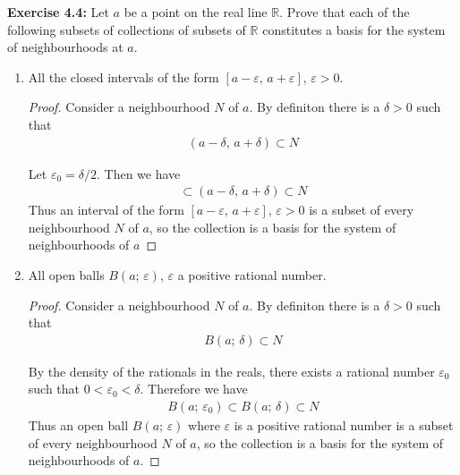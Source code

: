 \documentclass{article}
\begin{document}
\textbf{Exercise 4.4:} Let $a$ be a point on the real line $\mathbb{R}$. Prove that each of the following subsets of collections of 
subsets of $\mathbb{R}$ constitutes a basis for the system of neighbourhoods at $a$.

\begin{enumerate}[label=\roman*)]
    \item All the closed intervals of the form $[a - \varepsilon,\,a + \varepsilon],\, \varepsilon > 0$.
    
    \begin{proof}
        Consider a neighbourhood $N$ of $a$. By definiton there is a $\delta > 0$ such that
        \begin{align*}
            (a - \delta,\,a + \delta) \subset N
        \end{align*}

        Let $\varepsilon_0 = \delta / 2$. Then we have
        \begin{align*}
            [a - \varepsilon_0,\,a + \varepsilon_0] \subset (a - \delta,\,a + \delta) \subset N
        \end{align*}
        Thus an interval of the form $[a - \varepsilon,\,a + \varepsilon],\, \varepsilon > 0$ is a subset of every neighbourhood $N$ of $a$,
        so the collection is a basis for the system of neighbourhoods of $a$
    \end{proof}

    \item All open balls $B(a;\, \varepsilon)$, $\varepsilon$ a positive rational number.
    
    \begin{proof}
        Consider a neighbourhood $N$ of $a$. By definiton there is a $\delta > 0$ such that
        \begin{align*}
            B(a;\,\delta) \subset N
        \end{align*}

        By the density of the rationals in the reals, there exists a rational number $\varepsilon_0$ such that $0 < \varepsilon_0 < \delta$.
        Therefore we have
        \begin{align*}
            B(a;\,\varepsilon_0) \subset B(a;\,\delta) \subset N
        \end{align*}
        Thus an open ball $B(a;\, \varepsilon)$ where $\varepsilon$ is a positive rational number is a subset of every neighbourhood $N$ of $a$,
        so the collection is a basis for the system of neighbourhoods of $a$.
    \end{proof}


\end{enumerate}
\end{document}
